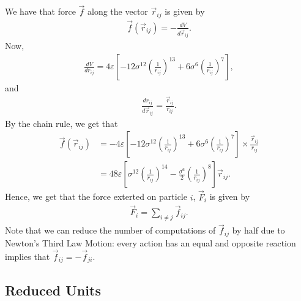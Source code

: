\documentclass[../Main.tex]{subfiles}
\begin{document}
We have that force $\vec{f}$ along the vector $\vec{r}_{ij}$ is given by
\begin{align*}
\vec{f}\left(\vec{r}_{ij}\right) = -\frac{dV}{d\vec{r}_{ij}}.
\end{align*}
Now,
\begin{align*}
\frac{dV}{dr_{ij}} = 4\varepsilon \left[ -12\sigma^{12}\left( \frac{1}{r_{ij}}\right)^{13} + 6\sigma^{6}\left( \frac{1}{r_{ij}}\right)^{7}\right],
\end{align*}
and
\begin{align*}
\frac{dr_{ij}}{d\vec{r}_{ij}} = \frac{\vec{r}_{ij}}{r_{ij}}.
\end{align*}
By the chain rule, we get that
\begin{align}
\vec{f}\left(\vec{r}_{ij}\right) & = -4\varepsilon \left[ -12\sigma^{12}\left( \frac{1}{r_{ij}}\right)^{13} + 6\sigma^{6}\left( \frac{1}{r_{ij}}\right)^{7}\right] \times \frac{\vec{r}_{ij}}{r_{ij}} \nonumber \\
& = 48\varepsilon \left[ \sigma^{12}\left( \frac{1}{r_{ij}}\right)^{14} - \frac{\sigma^{6}}{2}\left( \frac{1}{r_{ij}}\right)^{8}\right]\vec{r}_{ij}. \label{eqn:lennard-jones_force_one_atom}
\end{align}
Hence, we get that the force exterted on particle $i$, $\vec{F}_{i}$ is given by
\begin{align*}
	\vec{F}_{i} = \sum_{i \neq j} \vec{f}_{ij}.
\end{align*}
Note that we can reduce the number of computations of $\vec{f}_{ij}$ by half due to Newton's Third Law Motion: every action has an equal and opposite reaction implies that $\vec{f}_{ij} = -\vec{f}_{ji}$.

\subsection{Reduced Units} \label{subsection:reduced_units}
\end{document}
